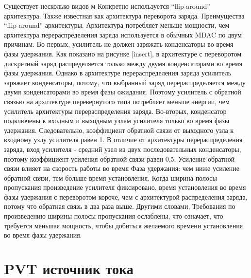 \documentclass[a4paper,12pt]{article} %
\begin{document}
Существует несколько видов м
Конкретно используется “flip-around” архитектура. Также известная как архитектура переворота заряда.
Преимущества “flip-around” архитектуры. Архитектура потребляет меньше мощности, чем архитектура перераспределения заряда используется в обычных MDAC по двум причинам. Во-первых, усилитель не должен заряжать конденсаторы во время фазы удержания. Как показано на рисунке [insert], в архитектуре с переворотом дискретный заряд распределяется только между двумя конденсаторами во время фазы удержания. Однако в архитектуре перераспределения заряда усилитель заряжает конденсаторы, потому, что выбранный заряд перераспределяется между двумя конденсаторами во время фазы ожидания. Поэтому усилитель с обратной связью на архитектуре перевернутого типа потребляет меньше энергии, чем усилитель архитектуры перераспределения заряда. Во-вторых, конденсатор подключены к входным и выходным узлам усилителя только во время фазы удержания. Следовательно, коэффициент обратной связи от выходного узла к входному узлу усилителя равен 1. В отличие от архитектуры перераспределения заряда, вход усилителя - средний узел из двух последовательных конденсаторы, поэтому коэффициент усиления обратной связи равен 0,5. Усиление обратной связи влияет на скорость работы во время Фаза удержания: чем ниже усиление обратной связи, тем больше время установления. Когда ширина полосы пропускания произведение усилителя фиксировано, время установления во время фазы удержания с переворотом короче, чем с архитектурой распределения заряда, потому что обратная связь в два раза выше. Другими словами, Требования по произведению ширины полосы пропускания ослаблены, что означает, что требуется меньшая мощность, чтобы добиться желаемого времени установления во время фазы удержания.






\section{PVT источник тока}
\end{document}
